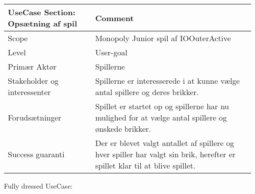 \begin{center}
\begin{tabular}{ | m{10em} | m{10cm}| }
        \hline
            UseCase Section: Opsætning af spil & Comment\\
        \hline
            Scope & Monopoly Junior spil af IOOuterActive\\
        \hline
            Level & User-goal\\
        \hline
            Primær Aktør & Spillerne\\
        \hline
            Stakeholder og interessenter & Spillerne er interesserede i at kunne vælge antal spillere og deres brikker.\\
        \hline
            Forudsætninger & Spillet er startet op og spillerne har nu mulighed for at vælge antal spillere og ønskede brikker.\\
        \hline
            Success guaranti & Der er blevet valgt antallet af spillere og hver spiller har valgt sin brik, herefter er spillet klar til at blive spillet.\\
        \hline
    \end{tabular}
\end{center}
\pagebreak
Fully dressed UseCase:
